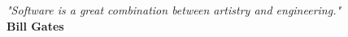 \chapter*{}

\renewcommand{\abstractnamefont}{\normalfont\Large\bfseries}


\hskip7cm

\vspace{\fill}
\begin{flushright}
\textit{"Software is a great combination between artistry and engineering."} \\[0.5cm]

\textbf{Bill Gates}
\end{flushright}

\vspace{\fill}




